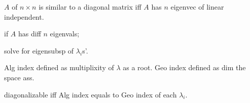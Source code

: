 \documentclass{ctexart}
\begin{document}
\begin{finale}
	$A$ of $n\times n$ is similar to a diagonal matrix iff $A$ has $n$ eigenvec of linear independent.
\end{finale}
\begin{corollary}
	\begin{cenum}
		\item if $A$ has diff $n$ eigenvals;
		\item solve for eigensubsp of $\lambda_i$s'.
	\end{cenum}
\end{corollary}
Alg index defined as multiplixity of $\lambda$ as a root. Geo index defined as dim the space ass.
\begin{finale}
	diagonalizable iff Alg index equals to Geo index of each $\lambda_i$.
\end{finale}
\end{document}
